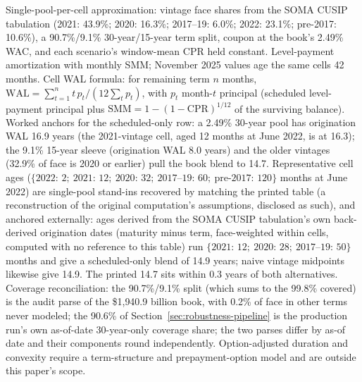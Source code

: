 \documentclass[12pt]{article}
\begin{document}
\begin{table}[H]
\begin{threeparttable}
\begin{tablenotes}[flushleft]
\item Single-pool-per-cell approximation: vintage face shares from the SOMA CUSIP tabulation (2021: 43.9\%; 2020: 16.3\%; 2017--19: 6.0\%; 2022: 23.1\%; pre-2017: 10.6\%), a 90.7\%/9.1\% 30-year/15-year term split, coupon at the book's 2.49\% WAC, and each scenario's window-mean CPR held constant. Level-payment amortization with monthly SMM; November 2025 values age the same cells 42 months. Cell WAL formula: for remaining term $n$ months, $\mathrm{WAL} = \sum_{t=1}^{n} t\, p_t / (12 \sum_{t} p_t)$, with $p_t$ month-$t$ principal (scheduled level-payment principal plus $\mathrm{SMM} = 1-(1-\mathrm{CPR})^{1/12}$ of the surviving balance). Worked anchors for the scheduled-only row: a 2.49\% 30-year pool has origination WAL 16.9 years (the 2021-vintage cell, aged 12 months at June 2022, is at 16.3); the 9.1\% 15-year sleeve (origination WAL 8.0 years) and the older vintages (32.9\% of face is 2020 or earlier) pull the book blend to 14.7. Representative cell ages ($\{2022{:}\,2;\ 2021{:}\,12;\ 2020{:}\,32;\ 2017\text{--}19{:}\,60;\ \text{pre-}2017{:}\,120\}$ months at June 2022) are single-pool stand-ins recovered by matching the printed table (a reconstruction of the original computation's assumptions, disclosed as such), and anchored externally: ages derived from the SOMA CUSIP tabulation's own back-derived origination dates (maturity minus term, face-weighted within cells, computed with no reference to this table) run $\{2021{:}\,12;\ 2020{:}\,28;\ 2017\text{--}19{:}\,50\}$ months and give a scheduled-only blend of 14.9 years; naive vintage midpoints likewise give 14.9. The printed 14.7 sits within 0.3 years of both alternatives. Coverage reconciliation: the 90.7\%/9.1\% split (which sums to the 99.8\% covered) is the audit parse of the \$1{,}940.9 billion book, with 0.2\% of face in other terms never modeled; the 90.6\% of Section~\ref{sec:robustness-pipeline} is the production run's own as-of-date 30-year-only coverage share; the two parses differ by as-of date and their components round independently. Option-adjusted duration and convexity require a term-structure and prepayment-option model and are outside this paper's scope.
\end{tablenotes}
\end{threeparttable}
\end{table}
\end{document}
